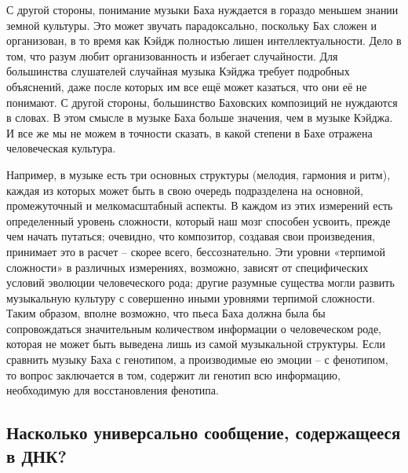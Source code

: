 \documentclass[../main.tex]{subfiles}
\begin{document}
С другой стороны, понимание музыки Баха нуждается в гораздо меньшем знании земной культуры. Это может звучать парадоксально, поскольку Бах сложен и организован, в то время как Кэйдж полностью лишен интеллектуальности. Дело в том, что разум любит организованность и избегает случайности. Для большинства слушателей случайная музыка Кэйджа требует подробных объяснений, даже после которых им все ещё может казаться, что они её не понимают. С другой стороны, большинство Баховских композиций не нуждаются в словах. В этом смысле в музыке Баха больше значения, чем в музыке Кэйджа. И все же мы не можем в точности сказать, в какой степени в Бахе отражена человеческая культура.

Например, в музыке есть три основных структуры (мелодия, гармония и ритм), каждая из которых может быть в свою очередь подразделена на основной, промежуточный и мелкомасштабный аспекты. В каждом из этих измерений есть определенный уровень сложности, который наш мозг способен усвоить, прежде чем начать путаться; очевидно, что композитор, создавая свои произведения, принимает это в расчет \--- скорее всего, бессознательно. Эти уровни «терпимой сложности» в различных измерениях, возможно, зависят от специфических условий эволюции человеческого рода; другие разумные существа могли развить музыкальную культуру с совершенно иными уровнями терпимой сложности. Таким образом, вполне возможно, что пьеса Баха должна была бы сопровождаться значительным количеством информации о человеческом роде, которая не может быть выведена лишь из самой музыкальной структуры. Если сравнить музыку Баха с генотипом, а производимые ею эмоции \--- с фенотипом, то вопрос заключается в том, содержит ли генотип всю информацию, необходимую для восстановления фенотипа.


\subsection{Насколько универсально сообщение, содержащееся в ДНК?}
\end{document}

